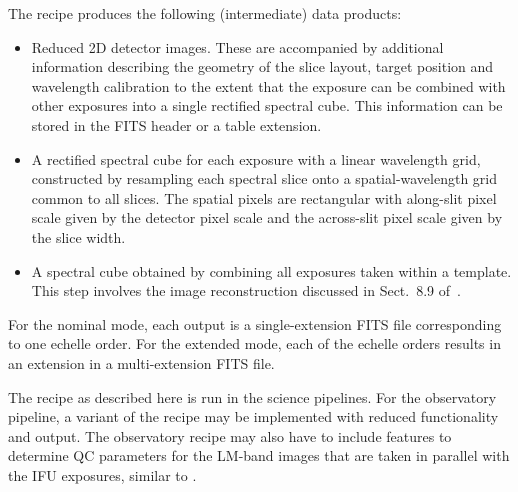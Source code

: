 The recipe produces the following (intermediate) data products:
\begin{itemize}\item Reduced 2D detector images. These are accompanied by additional
  information describing the geometry of the slice layout, target
  position and wavelength calibration to the extent that the exposure can be
  combined with other exposures into a single rectified spectral cube.
  This information can be stored in the FITS header or a table
  extension.
\item A rectified spectral cube for each exposure with a linear
  wavelength grid, constructed by resampling each spectral slice onto
  a spatial-wavelength grid common to all slices. The spatial pixels
  are rectangular with along-slit pixel scale given by the detector
  pixel scale and the across-slit pixel scale given by the slice
  width.
\item A spectral cube obtained by combining all exposures taken within
  a template. This step involves the image reconstruction discussed in
  Sect.~8.9 of~\cite{DRLS}.
\end{itemize}

For the nominal mode, each output is a single-extension FITS file
corresponding to one echelle order. For the extended mode, each of the
echelle orders results in an extension in a multi-extension FITS
file.

The recipe as described here is run in the science pipelines. For the
observatory pipeline, a variant of the recipe may be implemented with
reduced functionality and output. The observatory recipe may also have
to include features to determine QC parameters for the LM-band images
that are taken in parallel with the IFU exposures, similar to
 \hyperref[rec:metis_lm_img_basic_reduce]{}.

